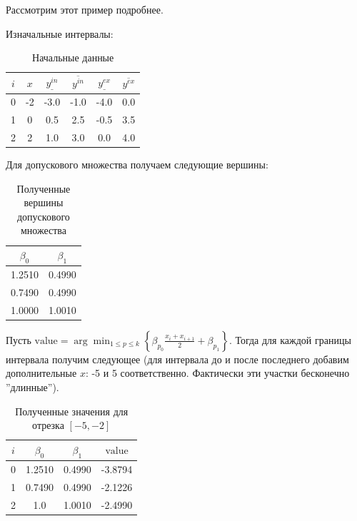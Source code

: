 Рассмотрим этот пример подробнее.

Изначальные интервалы:

\begin{table}[H]
    \centering
    \begin{tabular}{|c|c|c|c|c|c|}
        \hline
        $i$ & $x$ & $\underline{y^{in}}$ & $\overline{y^{in}}$ & $\underline{y^{ex}}$ & $\overline{y^{ex}}$ \\ \hline
        0 & -2 & -3.0 & -1.0 & -4.0 & 0.0\\ \hline
        1 & 0 & 0.5 & 2.5 & -0.5 & 3.5\\ \hline
        2 & 2 & 1.0 & 3.0 & 0.0 & 4.0\\ \hline
    \end{tabular}
    \caption{Начальные данные}
    \label{tab:my_label}
\end{table}

Для допускового множества получаем следующие вершины:

\begin{table}[H]
    \centering
    \begin{tabular}{|c|c|}
        \hline
        $\beta_0$ & $\beta_1$ \\ \hline
        1.2510 & 0.4990 \\ \hline
        0.7490 & 0.4990 \\ \hline
        1.0000 & 1.0010 \\ \hline
    \end{tabular}
    \caption{Полученные вершины допускового множества}
    \label{tab:my_label}
\end{table}

Пусть $\text{value} = \arg\min_{1 \leq p \leq k}{\left\{ \beta_{p_0} \frac{x_i + x_{i+1}}{2} + \beta_{p_1} \right\}}$. Тогда для каждой границы интервала получим следующее (для интервала до и после последнего добавим дополнительные $x$: -5 и 5 соответственно. Фактически эти участки бесконечно ''длинные'').

\begin{table}[H]
    \centering
    \begin{tabular}{|c|c|c|c|}
        \hline
        $i$ & $\beta_0$ & $\beta_1$ & $\text{value}$ \\ \hline
        0 & 1.2510 & 0.4990 & -3.8794 \\ \hline
        1 & 0.7490 & 0.4990 & -2.1226 \\ \hline
        2 & 1.0 & 1.0010 & -2.4990 \\ \hline
    \end{tabular}
    \caption{Полученные значения для отрезка $[-5, -2]$}
    \label{tab:my_label}
\end{table}

